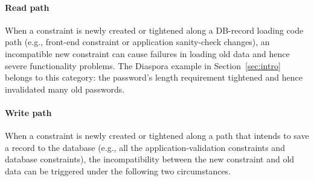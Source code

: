 \paragraph{\textbf{Read path}}
When a constraint is newly created or tightened along a DB-record loading code
path (e.g., front-end
constraint or application sanity-check changes), an  
incompatible new constraint can cause failures in
loading old data and hence severe functionality problems.
The Diaspora example in Section~\ref{sec:intro} belongs to this
category: the password's length requirement tightened and hence invalidated many old passwords.

\paragraph{\textbf{Write path}}
When a constraint is newly created or tightened along a path that intends to
save a record to the database (e.g., all the application-validation constraints
and database constraints), the incompatibility between the new constraint
and old data can be triggered under the following two circumstances.
 


